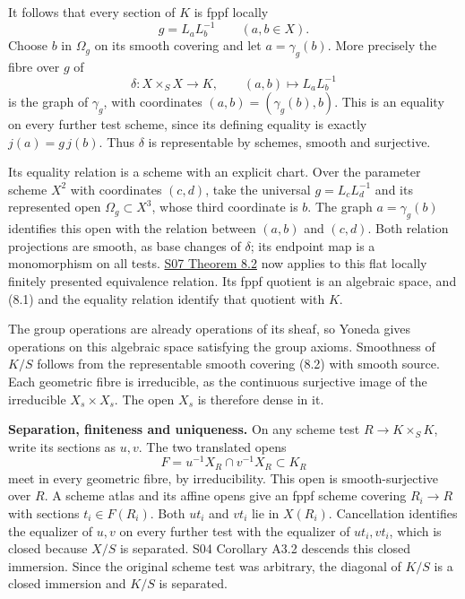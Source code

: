\documentclass[11pt,a4paper,openany]{report}
\begin{document}
It follows that every section of \(K\) is fppf locally \[
g=L_aL_b^{-1}\qquad(a,b\in X).
\tag{8.1}
\] Choose \(b\) in \(\Omega_g\) on its smooth covering and let \(a=\gamma_g(b)\). More precisely the fibre over \(g\) of \[
\delta:X\times_SX\longrightarrow K,\qquad
(a,b)\longmapsto L_aL_b^{-1}
\tag{8.2}
\] is the graph of \(\gamma_g\), with coordinates \((a,b)=(\gamma_g(b),b)\). This is an equality on every further test scheme, since its defining equality is exactly \(j(a)=g\,j(b)\). Thus \(\delta\) is representable by schemes, smooth and surjective.

Its equality relation is a scheme with an explicit chart. Over the parameter scheme \(X^2\) with coordinates \((c,d)\), take the universal \(g=L_cL_d^{-1}\) and its represented open \(\Omega_g\subset X^3\), whose third coordinate is \(b\). The graph \(a=\gamma_g(b)\) identifies this open with the relation between \((a,b)\) and \((c,d)\). Both relation projections are smooth, as base changes of \(\delta\); its endpoint map is a monomorphism on all tests. \href{https://github.com/KokunoYumeto/open-math-courses/blob/main/docs/courses/AG-RG/AG-RG-S07.md}{S07 Theorem 8.2} now applies to this flat locally finitely presented equivalence relation. Its fppf quotient is an algebraic space, and (8.1) and the equality relation identify that quotient with \(K\).

The group operations are already operations of its sheaf, so Yoneda gives operations on this algebraic space satisfying the group axioms. Smoothness of \(K/S\) follows from the representable smooth covering (8.2) with smooth source. Each geometric fibre is irreducible, as the continuous surjective image of the irreducible \(X_s\times X_s\). The open \(X_s\) is therefore dense in it.

\textbf{Separation, finiteness and uniqueness.} On any scheme test \(R\to K\times_SK\), write its sections as \(u,v\). The two translated opens \[
F=u^{-1}X_R\cap v^{-1}X_R\subset K_R
\] meet in every geometric fibre, by irreducibility. This open is smooth-surjective over \(R\). A scheme atlas and its affine opens give an fppf scheme covering \(R_i\to R\) with sections \(t_i\in F(R_i)\). Both \(ut_i\) and \(vt_i\) lie in \(X(R_i)\). Cancellation identifies the equalizer of \(u,v\) on every further test with the equalizer of \(ut_i,vt_i\), which is closed because \(X/S\) is separated. S04 Corollary A3.2 descends this closed immersion. Since the original scheme test was arbitrary, the diagonal of \(K/S\) is a closed immersion and \(K/S\) is separated.
\end{document}
